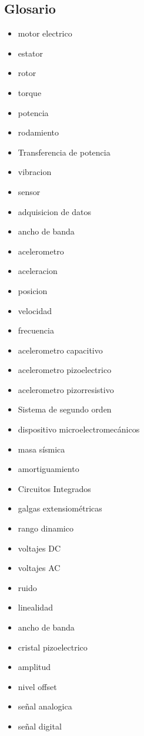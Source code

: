 
\subsection{Glosario}

\begin{itemize}
    \item motor electrico
    \item estator
    \item rotor
    \item torque
    \item potencia
    \item rodamiento
    \item Transferencia de potencia
    \item vibracion
    \item sensor
    \item adquisicion de datos
    \item ancho de banda
    \item acelerometro
    \item aceleracion
    \item posicion
    \item velocidad
    \item frecuencia
    \item acelerometro capacitivo
    \item acelerometro pizoelectrico
    \item acelerometro pizorresistivo
    \item Sistema de segundo orden
    \item dispositivo microelectromecánicos
    \item masa sísmica
    \item amortiguamiento
    \item Circuitos Integrados
    \item galgas extensiométricas
    \item rango dinamico
    \item voltajes DC
    \item voltajes AC
    \item ruido
    \item linealidad
    \item ancho de banda
    \item cristal pizoelectrico
    \item amplitud
    \item nivel offset
    \item señal analogica
    \item señal digital

\end{itemize}
